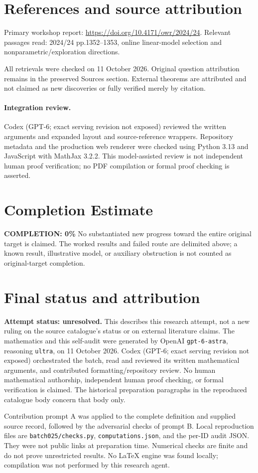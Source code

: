 \documentclass[11pt]{article}
\begin{document}
\section{References and source attribution}
Primary workshop report: \url{https://doi.org/10.4171/owr/2024/24}. Relevant passages read: 2024/24 pp.1352--1353, online linear-model selection and nonparametric/exploration directions.

All retrievals were checked on 11 October 2026. Original question attribution remains in the preserved Sources section. External theorems are attributed and not claimed as new discoveries or fully verified merely by citation.


\paragraph{Integration review.} Codex (GPT-6; exact serving revision not exposed) reviewed the written arguments and expanded layout and source-reference wrappers. Repository metadata and the production web renderer were checked using Python 3.13 and JavaScript with MathJax 3.2.2. This model-assisted review is not independent human proof verification; no PDF compilation or formal proof checking is asserted.

\section{Completion Estimate}
\noindent\textbf{COMPLETION: 0\%}
No substantiated new progress toward the entire original target is claimed. The worked results and failed route are delimited above; a known result, illustrative model, or auxiliary obstruction is not counted as original-target completion.

\section{Final status and attribution}
\textbf{Attempt status: unresolved.} This describes this research attempt, not a new ruling on the source catalogue's status or on external literature claims.
The mathematics and this self-audit were generated by OpenAI \texttt{gpt-6-astra}, reasoning \texttt{ultra}, on 11 October 2026. Codex (GPT-6; exact serving revision not exposed) orchestrated the batch, read and reviewed its written mathematical arguments, and contributed formatting/repository review. No human mathematical authorship, independent human proof checking, or formal verification is claimed. The historical preparation paragraphs in the reproduced catalogue body concern that body only.

Contribution prompt A was applied to the complete definition and supplied source record, followed by the adversarial checks of prompt B. Local reproduction files are \texttt{batch025/checks.py}, \texttt{computations.json}, and the per-ID audit JSON. They were not public links at preparation time. Numerical checks are finite and do not prove unrestricted results. No LaTeX engine was found locally; compilation was not performed by this research agent.
\end{document}
